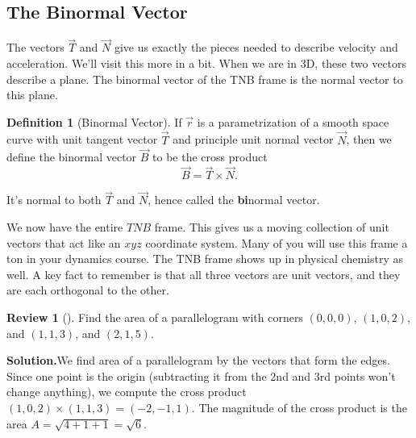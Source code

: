 \documentclass[10pt,]{book}
\newcommand{\terminology}[1]{\textbf{#1}}
\theoremstyle{plain}
\theoremstyle{definition}
\newtheorem{definition}[theorem]{Definition}
\theoremstyle{definition}
\theoremstyle{definition}
\newtheorem{project}{Review}[section]
\theoremstyle{definition}
\theoremstyle{definition}
\numberwithin{equation}{section}
\begin{document}
\subsection[{The Binormal Vector}]{The Binormal Vector}\label{subsection-45}
The vectors \(\vec T\) and \(\vec N\) give us exactly the pieces needed to describe velocity and acceleration. We'll visit this more in a bit. When we are in 3D, these two vectors describe a plane. The binormal vector of the TNB frame is the normal vector to this plane.%
\begin{definition}[{Binormal Vector}]\label{definition-29}
If \(\vec r\) is a parametrization of a smooth space curve with unit tangent vector \(\vec T\) and principle unit normal vector \(\vec N\), then we define the binormal vector \(\vec B\) to be the cross product%
\begin{equation*}
\vec B = \vec T\times \vec N.
\end{equation*}
%
\par
It's normal to both \(\vec T\) and \(\vec N\), hence called the \terminology{bi}normal vector.%
\end{definition}
We now have the entire \(TNB\) frame. This gives us a moving collection of unit vectors that act like an \(xyz\) coordinate system. Many of you will use this frame a ton in your dynamics course. The TNB frame shows up in physical chemistry as well. A key fact to remember is that all three vectors are unit vectors, and they are each orthogonal to the other.%
\begin{project}[]\label{project-14}
Find the area of a parallelogram with corners \((0,0,0)\), \((1,0,2)\), and \((1,1,3)\), and \((2,1,5)\).%
\par\medskip\noindent%
\textbf{Solution.}\quad We find area of a parallelogram by the vectors that form the edges. Since one point is the origin (subtracting it from the 2nd and 3rd points won't change anything), we compute the cross product \((1,0,2)\times 
(1,1,3) 
= (-2,-1,1)\). The magnitude of the cross product is the area \(A = \sqrt{4+1+1}=\sqrt{6}\).%
\end{project}
\end{document}
